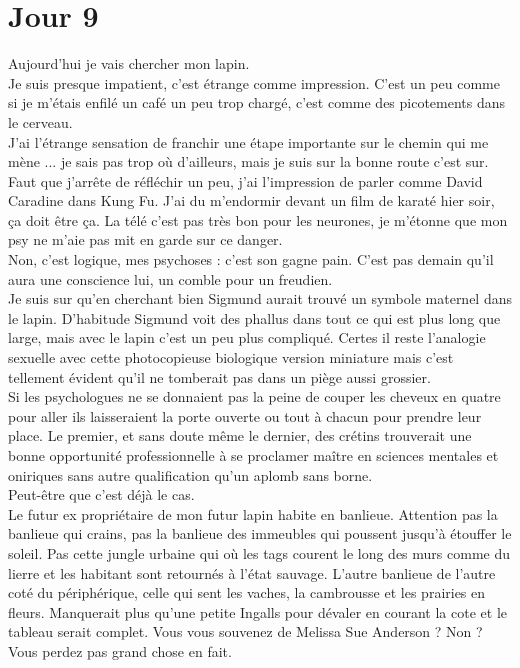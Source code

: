 \chapter*{Jour 9}
Aujourd'hui je vais chercher mon lapin. \\
Je suis presque impatient, c'est étrange comme impression. C'est un peu comme si je m'étais enfilé un café un peu trop chargé, c'est comme des picotements dans le cerveau. \\
J'ai l'étrange sensation de franchir une étape importante sur le chemin qui me mène ... je sais pas trop où d'ailleurs, mais je suis sur la bonne route c'est sur. Faut que j’arrête de réfléchir un peu, j'ai l'impression de parler comme David Caradine dans Kung Fu. J'ai du m'endormir devant un film de karaté hier soir, ça doit être ça. La télé c'est pas très bon pour les neurones, je m'étonne que mon psy ne m'aie pas mit en garde sur ce danger. \\

Non, c'est logique, mes psychoses : c'est son gagne pain. C'est pas demain qu'il aura une conscience lui, un comble pour un freudien.\\
Je suis sur qu'en cherchant bien Sigmund aurait trouvé un symbole maternel dans le lapin. D'habitude Sigmund voit des phallus dans tout ce qui est plus long que large, mais avec le lapin c'est un peu plus compliqué. Certes il reste l'analogie sexuelle avec cette photocopieuse biologique version miniature mais c'est tellement évident qu'il ne tomberait pas dans un piège aussi grossier. \\
Si les psychologues ne se donnaient pas la peine de couper les cheveux en quatre pour aller ils laisseraient la porte ouverte ou tout à chacun pour prendre leur place. Le premier, et sans doute même le dernier, des crétins trouverait une bonne opportunité professionnelle à se proclamer maître en sciences mentales et oniriques sans autre qualification qu'un aplomb sans borne. \\
Peut-être que c'est déjà le cas. \\

Le futur ex propriétaire de mon futur lapin habite en banlieue. Attention pas la banlieue qui crains, pas la banlieue des immeubles qui poussent jusqu'à étouffer le soleil. Pas cette jungle urbaine qui où les tags courent le long des murs comme du lierre et les habitant sont retournés à l'état sauvage. L'autre banlieue de l'autre coté du périphérique, celle qui sent les vaches, la cambrousse et les prairies en fleurs. Manquerait plus qu'une petite Ingalls pour dévaler en courant la cote et le tableau serait complet. Vous vous souvenez de Melissa Sue Anderson ? Non ? Vous perdez pas grand chose en fait. \\


